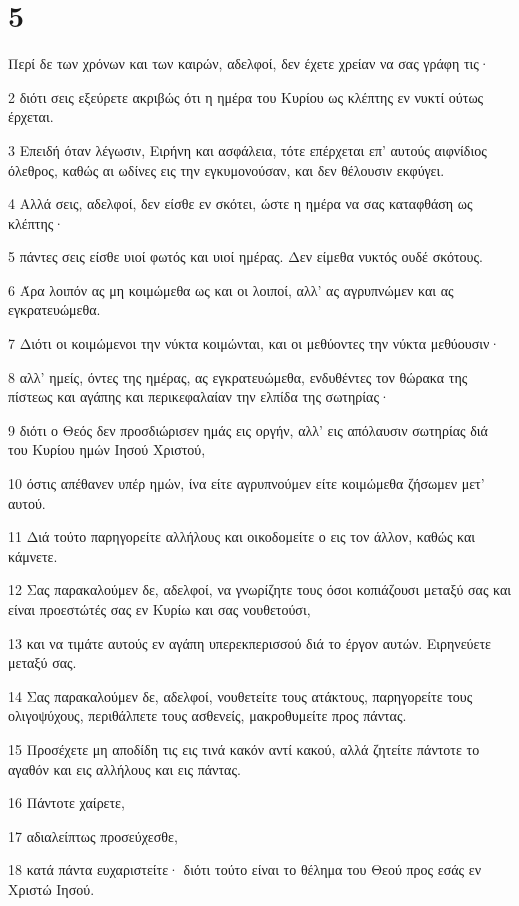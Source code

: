 \chapter{5}

\par Περί δε των χρόνων και των καιρών, αδελφοί, δεν έχετε χρείαν να σας γράφη τις·
\par 2 διότι σεις εξεύρετε ακριβώς ότι η ημέρα του Κυρίου ως κλέπτης εν νυκτί ούτως έρχεται.
\par 3 Επειδή όταν λέγωσιν, Ειρήνη και ασφάλεια, τότε επέρχεται επ' αυτούς αιφνίδιος όλεθρος, καθώς αι ωδίνες εις την εγκυμονούσαν, και δεν θέλουσιν εκφύγει.
\par 4 Αλλά σεις, αδελφοί, δεν είσθε εν σκότει, ώστε η ημέρα να σας καταφθάση ως κλέπτης·
\par 5 πάντες σεις είσθε υιοί φωτός και υιοί ημέρας. Δεν είμεθα νυκτός ουδέ σκότους.
\par 6 Άρα λοιπόν ας μη κοιμώμεθα ως και οι λοιποί, αλλ' ας αγρυπνώμεν και ας εγκρατευώμεθα.
\par 7 Διότι οι κοιμώμενοι την νύκτα κοιμώνται, και οι μεθύοντες την νύκτα μεθύουσιν·
\par 8 αλλ' ημείς, όντες της ημέρας, ας εγκρατευώμεθα, ενδυθέντες τον θώρακα της πίστεως και αγάπης και περικεφαλαίαν την ελπίδα της σωτηρίας·
\par 9 διότι ο Θεός δεν προσδιώρισεν ημάς εις οργήν, αλλ' εις απόλαυσιν σωτηρίας διά του Κυρίου ημών Ιησού Χριστού,
\par 10 όστις απέθανεν υπέρ ημών, ίνα είτε αγρυπνούμεν είτε κοιμώμεθα ζήσωμεν μετ' αυτού.
\par 11 Διά τούτο παρηγορείτε αλλήλους και οικοδομείτε ο εις τον άλλον, καθώς και κάμνετε.
\par 12 Σας παρακαλούμεν δε, αδελφοί, να γνωρίζητε τους όσοι κοπιάζουσι μεταξύ σας και είναι προεστώτές σας εν Κυρίω και σας νουθετούσι,
\par 13 και να τιμάτε αυτούς εν αγάπη υπερεκπερισσού διά το έργον αυτών. Ειρηνεύετε μεταξύ σας.
\par 14 Σας παρακαλούμεν δε, αδελφοί, νουθετείτε τους ατάκτους, παρηγορείτε τους ολιγοψύχους, περιθάλπετε τους ασθενείς, μακροθυμείτε προς πάντας.
\par 15 Προσέχετε μη αποδίδη τις εις τινά κακόν αντί κακού, αλλά ζητείτε πάντοτε το αγαθόν και εις αλλήλους και εις πάντας.
\par 16 Πάντοτε χαίρετε,
\par 17 αδιαλείπτως προσεύχεσθε,
\par 18 κατά πάντα ευχαριστείτε· διότι τούτο είναι το θέλημα του Θεού προς εσάς εν Χριστώ Ιησού.
